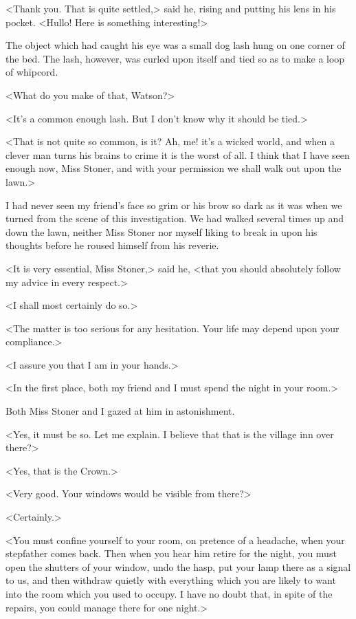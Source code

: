 <Thank you. That is quite settled,> said he, rising and putting his lens in his pocket. <Hullo! Here is something interesting!>

The object which had caught his eye was a small dog lash hung on one corner of the bed. The lash, however, was curled upon itself and tied so as to make a loop of whipcord.

<What do you make of that, Watson?>

<It's a common enough lash. But I don't know why it should be tied.>

<That is not quite so common, is it? Ah, me! it's a wicked world, and when a clever man turns his brains to crime it is the worst of all. I think that I have seen enough now, Miss Stoner, and with your permission we shall walk out upon the lawn.>

I had never seen my friend's face so grim or his brow so dark as it was when we turned from the scene of this investigation. We had walked several times up and down the lawn, neither Miss Stoner nor myself liking to break in upon his thoughts before he roused himself from his reverie.

<It is very essential, Miss Stoner,> said he, <that you should absolutely follow my advice in every respect.>

<I shall most certainly do so.>

<The matter is too serious for any hesitation. Your life may depend upon your compliance.>

<I assure you that I am in your hands.>

<In the first place, both my friend and I must spend the night in your room.>

Both Miss Stoner and I gazed at him in astonishment.

<Yes, it must be so. Let me explain. I believe that that is the village inn over there?>

<Yes, that is the Crown.>

<Very good. Your windows would be visible from there?>

<Certainly.>

<You must confine yourself to your room, on pretence of a headache, when your stepfather comes back. Then when you hear him retire for the night, you must open the shutters of your window, undo the hasp, put your lamp there as a signal to us, and then withdraw quietly with everything which you are likely to want into the room which you used to occupy. I have no doubt that, in spite of the repairs, you could manage there for one night.>

